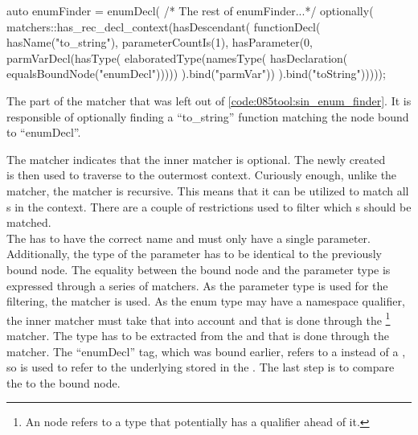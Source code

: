 \begin{listing}[H]
    \begin{cppcode}
auto enumFinder = enumDecl(
  /* The rest of enumFinder...*/
  optionally(
    matchers::has_rec_decl_context(hasDescendant(
      functionDecl(
        hasName("to_string"),
        parameterCountIs(1),
        hasParameter(0,
          parmVarDecl(hasType(
            elaboratedType(namesType(
              hasDeclaration(
                equalsBoundNode("enumDecl")))))
          ).bind("parmVar"))
      ).bind("toString")))));
    \end{cppcode}
    \caption{The part of the  matcher that was left out of \cref{code:085tool:sin_enum_finder}. It is responsible of optionally finding a ``to\_string'' function matching the  node bound to ``enumDecl''.}
    \label{code:085tool:has_enum_to_string}
\end{listing}

The  matcher indicates that the inner matcher is optional. The newly created \\ is then used to traverse to the outermost context.
Curiously enough, unlike the  matcher, the  matcher is recursive. This means that it can be utilized to match all s in the context.
There are a couple of restrictions used to filter which s should be matched.\\The {} has to have the correct name and must only have a single parameter. Additionally, the type of the parameter has to be identical to the previously bound node.
The equality between the bound node and the parameter type is expressed through a series of matchers. As the parameter type is used for the filtering, the  matcher is used. As the enum type may have a namespace qualifier, the inner matcher must take that into account and that is done through the \footnote{
    An  node refers to a type that potentially has a qualifier ahead of it.
} matcher.
The type has to be extracted from the  and that is done through the  matcher.
The ``enumDecl'' tag, which was bound earlier, refers to a  instead of a , so  is used to refer to the underlying  stored in the . The last step is to compare the  to the bound node.

